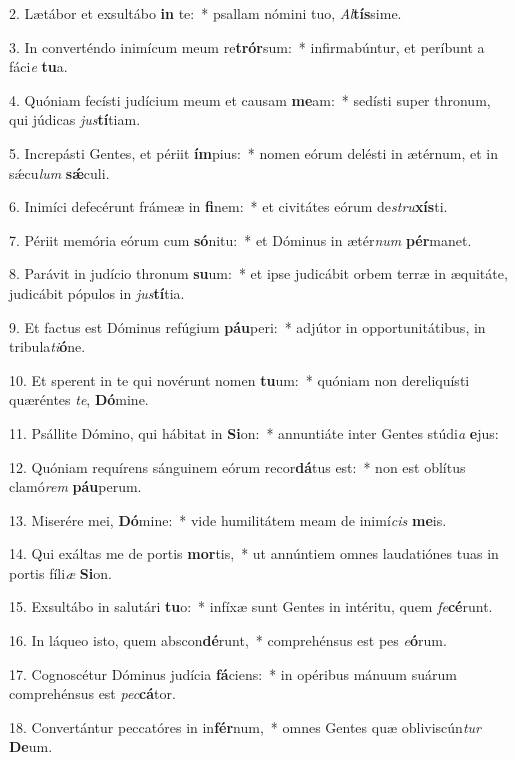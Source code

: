2. Lætábor et exsultábo \textbf{in} te:~*  psallam nómini tuo, \textit{Al}\textbf{tís}sime.\

3. In converténdo inimícum meum re\textbf{trór}sum:~*  infirmabúntur, et períbunt a fáci\textit{e} \textbf{tu}a.\

4. Quóniam fecísti judícium meum et causam \textbf{me}am:~*  sedísti super thronum, qui júdicas \textit{jus}\textbf{tí}tiam.\

5. Increpásti Gentes, et périit \textbf{ím}pius:~*  nomen eórum delésti in ætérnum, et in sǽcu\textit{lum} \textbf{sǽ}culi.\

6. Inimíci defecérunt frámeæ in \textbf{fi}nem:~*  et civitátes eórum de\textit{stru}\textbf{xís}ti.\

7. Périit memória eórum cum \textbf{só}nitu:~*  et Dóminus in ætér\textit{num} \textbf{pér}manet.\

8. Parávit in judício thronum \textbf{su}um:~*  et ipse judicábit orbem terræ in æquitáte, judicábit pópulos in \textit{jus}\textbf{tí}tia.\

9. Et factus est Dóminus refúgium \textbf{páu}peri:~*  adjútor in opportunitátibus, in tribula\textit{ti}\textbf{ó}ne.\

10. Et sperent in te qui novérunt nomen \textbf{tu}um:~*  quóniam non dereliquísti quæréntes \textit{te}, \textbf{Dó}mine.\

11. Psállite Dómino, qui hábitat in \textbf{Si}on:~*  annuntiáte inter Gentes stúdi\textit{a} \textbf{e}jus:\

12. Quóniam requírens sánguinem eórum recor\textbf{dá}tus est:~*  non est oblítus clamó\textit{rem} \textbf{páu}perum.\

13. Miserére mei, \textbf{Dó}mine:~*  vide humilitátem meam de inimí\textit{cis} \textbf{me}is.\

14. Qui exáltas me de portis \textbf{mor}tis,~*  ut annúntiem omnes laudatiónes tuas in portis fíli\textit{æ} \textbf{Si}on.\

15. Exsultábo in salutári \textbf{tu}o:~*  infíxæ sunt Gentes in intéritu, quem \textit{fe}\textbf{cé}runt.\

16. In láqueo isto, quem abscon\textbf{dé}runt,~*  comprehénsus est pes \textit{e}\textbf{ó}rum.\

17. Cognoscétur Dóminus judícia \textbf{fá}ciens:~*  in opéribus mánuum suárum comprehénsus est \textit{pec}\textbf{cá}tor.\

18. Convertántur peccatóres in in\textbf{fér}num,~*  omnes Gentes quæ obliviscún\textit{tur} \textbf{De}um.\

